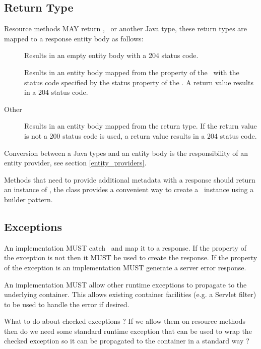 \subsection{Return Type}
\label{resource_method_return}

Resource methods MAY return , \Response\ or another Java type, these return types are mapped to a response entity body as follows:

\begin{description}
\item[] Results in an empty entity body with a 204 status code.
\item[\Response] Results in an entity body mapped from the  property of the \Response\ with the status code specified by the status property of the \Response. A  return value results in a 204 status code.
\item[Other] Results in an entity body mapped from the return type. If the return value is not  a 200 status code is used, a  return value results in a 204 status code.
\end{description}

Conversion between a Java types and an entity body is the responsibility of an entity provider, see section \ref{entity_providers}.

Methods that need to provide additional metadata with a response should return an instance of \Response, the \Response{} class provides a convenient way to create a \Response\ instance using a builder pattern.

\subsection{Exceptions}

An implementation MUST catch \WebAppExc\ and map it to a response. If the  property of the exception is not  then it MUST be used to create the response. If the  property of the exception is  an implementation MUST generate a server error response.

An implementation MUST allow other runtime exceptions to propagate to the underlying container. This allows existing container facilities (e.g. a Servlet filter) to be used to handle the error if desired.

\begin{ednote}What to do about checked exceptions ? If we allow them on resource methods then do we need some standard runtime exception that can be used to wrap the checked exception so it can be propagated to the container in a standard way ?\end{ednote}

